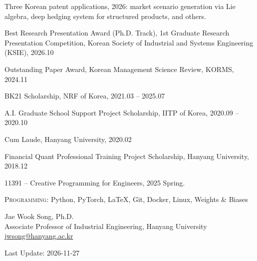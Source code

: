 \documentclass[11pt]{article}
\renewcommand{\lastupdate}{\par\vspace{18pt}\hfill{\small Last Update: 2026-11-27}\par}
\begin{document}
\begin{blist}
\item Three Korean patent applications, 2026: market scenario generation via Lie algebra, deep hedging system for structured products, and others.
\end{blist}

\begin{blist}[itemsep=3pt]
\item Best Research Presentation Award (Ph.D. Track), 1st Graduate Research Presentation Competition, Korean Society of Industrial and Systems Engineering (KSIE), 2026.10
\item Outstanding Paper Award, Korean Management Science Review, KORMS, 2024.11
\item BK21 Scholarship, NRF of Korea, 2021.03 – 2025.07
\item A.I. Graduate School Support Project Scholarship, IITP of Korea, 2020.09 – 2020.10
\item Cum Laude, Hanyang University, 2020.02
\item Financial Quant Professional Training Project Scholarship, Hanyang University, 2018.12
\end{blist}

\begin{blist}
\item 11391 – Creative Programming for Engineers, 2025 Spring.
\end{blist}

\begin{blist}
\item {\scshape Programming}: Python, PyTorch, \LaTeX, Git, Docker, Linux, Weights \& Biases
\end{blist}

\begin{ind}
Jae Wook Song, Ph.D.\\
Associate Professor of Industrial Engineering, Hanyang University\\
\href{mailto:jwsong@hanyang.ac.kr}{jwsong@hanyang.ac.kr}
\end{ind}

\lastupdate
\end{document}
